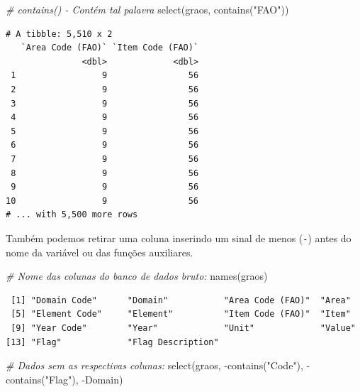 \documentclass[
  brazilian,
]{book}
\newenvironment{Shaded}{\begin{snugshade}}{\end{snugshade}}
\newcommand{\CommentTok}[1]{\textcolor[rgb]{0.56,0.35,0.01}{\textit{#1}}}
\newcommand{\FunctionTok}[1]{\textcolor[rgb]{0.00,0.00,0.00}{#1}}
\newcommand{\NormalTok}[1]{#1}
\newcommand{\SpecialCharTok}[1]{\textcolor[rgb]{0.00,0.00,0.00}{#1}}
\newcommand{\StringTok}[1]{\textcolor[rgb]{0.31,0.60,0.02}{#1}}
\begin{document}
\begin{Shaded}
\begin{Highlighting}[]
\CommentTok{\# contains() {-} Contém tal palavra}
\FunctionTok{select}\NormalTok{(graos, }\FunctionTok{contains}\NormalTok{(}\StringTok{"FAO"}\NormalTok{))}
\end{Highlighting}
\end{Shaded}

\begin{verbatim}
# A tibble: 5,510 x 2
   `Area Code (FAO)` `Item Code (FAO)`
               <dbl>             <dbl>
 1                 9                56
 2                 9                56
 3                 9                56
 4                 9                56
 5                 9                56
 6                 9                56
 7                 9                56
 8                 9                56
 9                 9                56
10                 9                56
# ... with 5,500 more rows
\end{verbatim}

Também podemos retirar uma coluna inserindo um sinal de menos (\texttt{-}) antes do nome da variável ou das funções auxiliares.

\begin{Shaded}
\begin{Highlighting}[]
\CommentTok{\# Nome das colunas do banco de dados bruto:}
\FunctionTok{names}\NormalTok{(graos)}
\end{Highlighting}
\end{Shaded}

\begin{verbatim}
 [1] "Domain Code"      "Domain"           "Area Code (FAO)"  "Area"            
 [5] "Element Code"     "Element"          "Item Code (FAO)"  "Item"            
 [9] "Year Code"        "Year"             "Unit"             "Value"           
[13] "Flag"             "Flag Description"
\end{verbatim}

\begin{Shaded}
\begin{Highlighting}[]
\CommentTok{\# Dados sem as respectivas colunas:}
\FunctionTok{select}\NormalTok{(graos,}
       \SpecialCharTok{{-}}\FunctionTok{contains}\NormalTok{(}\StringTok{"Code"}\NormalTok{), }\SpecialCharTok{{-}}\FunctionTok{contains}\NormalTok{(}\StringTok{"Flag"}\NormalTok{), }\SpecialCharTok{{-}}\NormalTok{Domain)}
\end{Highlighting}
\end{Shaded}
\end{document}

